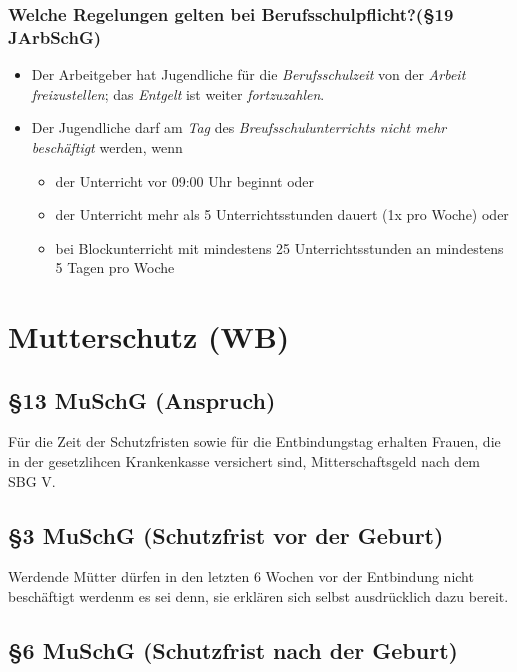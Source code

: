 \documentclass[a4paper, 12pt]{report}
\begin{document}
\begin{multicols}{2}
\subsubsection{Welche Regelungen gelten bei Berufsschulpflicht?(\S 19 JArbSchG)}
\begin{itemize}
    \item Der Arbeitgeber hat Jugendliche für die \emph{Berufsschulzeit} von der
	\emph{Arbeit freizustellen}; das \emph{Entgelt} ist weiter
	\emph{fortzuzahlen}.
    \item Der Jugendliche darf am \emph{Tag} des \emph{Breufsschulunterrichts
	nicht mehr beschäftigt} werden, wenn
	\begin{itemize}
	    \item der Unterricht vor 09:00 Uhr beginnt oder
	    \item der Unterricht mehr als 5 Unterrichtsstunden dauert (1x pro
		Woche) oder
	    \item bei Blockunterricht mit mindestens 25 Unterrichtsstunden an
		mindestens 5 Tagen pro Woche
	\end{itemize}
\end{itemize}

\section{Mutterschutz (WB)}

\subsection{\S 13 MuSchG (Anspruch)}

Für die Zeit der Schutzfristen sowie für die Entbindungstag erhalten Frauen, die
in der gesetzlihcen Krankenkasse versichert sind, Mitterschaftsgeld nach dem SBG
V.

\subsection{\S 3 MuSchG (Schutzfrist vor der Geburt)}

Werdende Mütter dürfen in den letzten 6 Wochen vor der Entbindung nicht
beschäftigt werdenm es sei denn, sie erklären sich selbst ausdrücklich dazu
bereit.

\subsection{\S 6 MuSchG (Schutzfrist nach der Geburt)}


\end{multicols}
\end{document}
